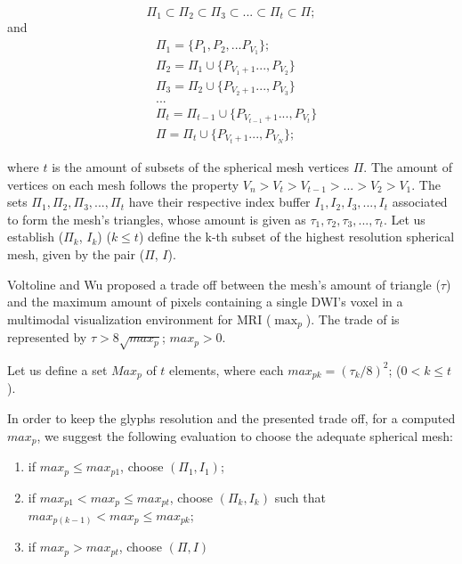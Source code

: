 \documentclass[twoside,twocolumn,10pt]{article}
\begin{document}
\begin{equation}
\label{eq::subset_condition1}
    \Pi_{1} \subset \Pi_{2} \subset \Pi_{3} \subset ... \subset \Pi_{t} \subset \Pi;
\end{equation}
and
\begin{align}
 \label{eq::subset_condition2}
    &\Pi_{1} = \{P_1, P_2,... P_{V_1}\}; \nonumber\\
    &\Pi_{2} = \Pi_1 \cup \{ P_{V_1+1}..., P_{V_2}\} \nonumber\\
    &\Pi_{3} = \Pi_2 \cup \{ P_{V_2+1}..., P_{V_3}\} \nonumber\\
    &... \\
    &\Pi_{t} = \Pi_{t-1} \cup \{ P_{V_{t-1}+1}..., P_{V_t}\} \nonumber\\
    &\Pi = \Pi_{t} \cup \{ P_{V_t+1}..., P_{V_N}\}; \nonumber
\end{align}


where $t$ is the amount of subsets of the spherical mesh vertices $\Pi$. The amount of vertices on each mesh follows the property $V_n > V_t > V_{t-1} > ... > V_2 > V_1$. The sets $\Pi_{1}, \Pi_{2}, \Pi_{3}, ..., \Pi_{t}$ have their respective index buffer $I_{1}, I_{2}, I_{3}, ..., I_{t}$ associated to form the mesh's triangles, whose amount is given as $\tau_1, \tau_2, \tau_3, ..., \tau_t$. Let us establish ($\Pi_k$, $I_k$) ($k \leq t$) define the k-th subset of the highest resolution spherical mesh, given by the pair ($\Pi$, $I$).


Voltoline and Wu \cite{voltoline2021} proposed a trade off between the mesh's amount of triangle ($\tau$) and the maximum amount of pixels containing a single DWI's voxel in a multimodal visualization environment for MRI ($\max_p$). The trade of is represented by $\tau > 8\sqrt{max_p}$; $max_p > 0$.

Let us define a set $Max_p$ of $t$ elements, where each $max_{pk} = (\tau_k/8)^2$; ($0 < k \leq t$).

In order to keep the glyphs resolution and the presented trade off, for a computed $max_p$, we suggest the following evaluation to choose the adequate spherical mesh: 

\begin{enumerate}
    \item if $max_p \leq max_{p1}$, choose $(\Pi_1, I_1)$;
    \item if $max_{p1} < max_p \leq max_{pt}$, choose $(\Pi_k, I_k)$ such that $max_{p(k-1)} < max_p \leq max_{pk}$;
    \item if $max_p > max_{pt}$, choose $(\Pi, I)$
\end{enumerate}
\end{document}
